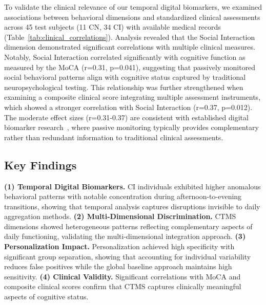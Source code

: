 \documentclass[sigconf, anonymous, 9pt, nonacm]{acmart}
\begin{document}
To validate the clinical relevance of our temporal digital biomarkers, we examined associations between behavioral dimensions and standardized clinical assessments across 45 test subjects (11 CN, 34 CI) with available medical records (Table~\ref{tab:clinical_correlations}).
Analysis revealed that the Social Interaction dimension demonstrated significant correlations with multiple clinical measures. Notably, Social Interaction correlated significantly with cognitive function as measured by the MoCA (r=0.31, p=0.041), suggesting that passively monitored social behavioral patterns align with cognitive status captured by traditional neuropsychological testing. This relationship was further strengthened when examining a composite clinical score integrating multiple assessment instruments, which showed a stronger correlation with Social Interaction (r=0.37, p=0.012). The moderate effect sizes (r=0.31-0.37) are consistent with established digital biomarker research~\cite{Kourtis2019}, where passive monitoring typically provides complementary rather than redundant information to traditional clinical assessments. 

\vspace{-0.5em}

\subsection{Key Findings}

\textbf{(1) Temporal Digital Biomarkers.} CI individuals exhibited higher anomalous behavioral patterns with notable concentration during afternoon-to-evening transitions, showing that temporal analysis captures disruptions invisible to daily aggregation methods.
\textbf{(2) Multi-Dimensional Discrimination.} CTMS dimensions showed heterogeneous patterns reflecting complementary aspects of daily functioning, validating the multi-dimensional integration approach.
\textbf{(3) Personalization Impact.} Personalization achieved high specificity with significant group separation, showing that accounting for individual variability reduces false positives while the global baseline approach maintains high sensitivity.
\textbf{(4) Clinical Validity.} Significant correlations with MoCA and composite clinical scores confirm that CTMS captures clinically meaningful aspects of cognitive status.
\end{document}
